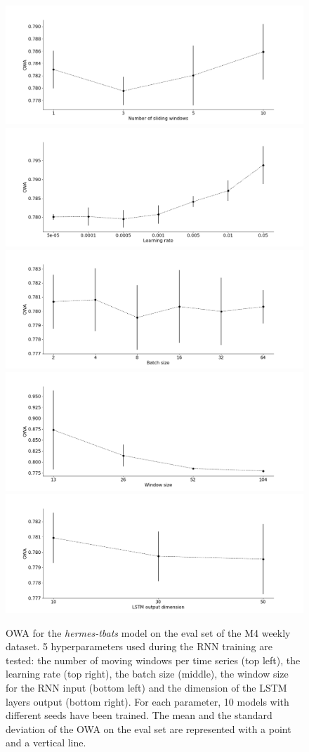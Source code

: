 \documentclass[10pt]{article} %
\begin{document}
 
\begin{figure}
\centering
  \includegraphics[width=.49\linewidth]{m4_sliding_window.png}
  \includegraphics[width=.49\linewidth]{m4_learning_rate.png}
  \includegraphics[width=1.\linewidth]{m4_batch_size.png}
  \includegraphics[width=.49\linewidth]{m4_window_size.png}
  \includegraphics[width=.49\linewidth]{m4_lstm_dim.png}
\caption{OWA for the \textit{hermes-tbats} model on the eval set of the M4 weekly dataset. 5 hyperparameters used during the RNN training are tested: the number of moving windows per time series (top left), the learning rate (top right), the batch size (middle), the window size for the RNN input (bottom left) and the dimension of the LSTM layers output (bottom right). For each parameter, 10 models with different seeds have been trained. The mean and the standard deviation of the OWA on the eval set are represented with a point and a vertical line.}
\label{fig:m4parameter}
\end{figure}
\end{document}
